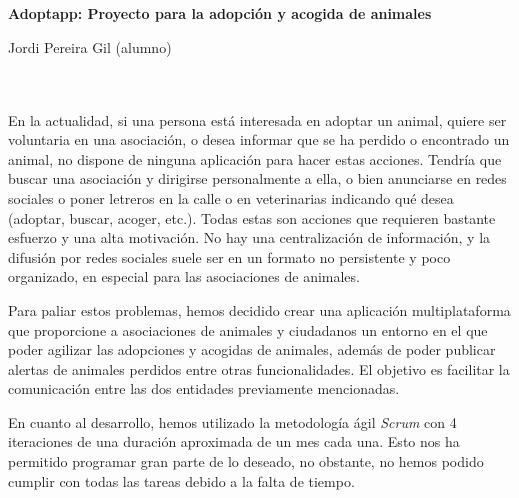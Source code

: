 \chapter*{}






\cleardoublepage
\thispagestyle{empty}

\begin{center}
{\large\bfseries Adoptapp: Proyecto para la adopción y acogida de animales}\\
\end{center}
\begin{center}
Jordi Pereira Gil (alumno)\\
\end{center}

\\

\vspace{0.7cm}
\\

En la actualidad, si una persona está interesada en adoptar un animal, quiere ser voluntaria en una asociación, o desea informar que se ha perdido o encontrado un animal, no dispone de ninguna aplicación para hacer estas acciones. Tendría que buscar una asociación y dirigirse personalmente a ella, o bien anunciarse en redes sociales o poner letreros en la calle o en veterinarias indicando qué desea (adoptar, buscar, acoger, etc.). Todas estas son acciones que requieren bastante esfuerzo y una alta motivación. No hay una centralización de información, y la difusión por redes sociales suele ser en un formato no persistente y poco organizado, en especial para las asociaciones de animales.

Para paliar estos problemas, hemos decidido crear una aplicación multiplataforma que proporcione a asociaciones de animales y ciudadanos un entorno en el que poder agilizar las adopciones y acogidas de animales, además de poder publicar alertas de animales perdidos entre otras funcionalidades. El objetivo es facilitar la comunicación entre las dos entidades previamente mencionadas.

En cuanto al desarrollo, hemos utilizado la metodología ágil \textit{Scrum} con 4 iteraciones de una duración aproximada de un mes cada una. Esto nos ha permitido programar gran parte de lo deseado, no obstante, no hemos podido cumplir con todas las tareas debido a la falta de tiempo.
\cleardoublepage


